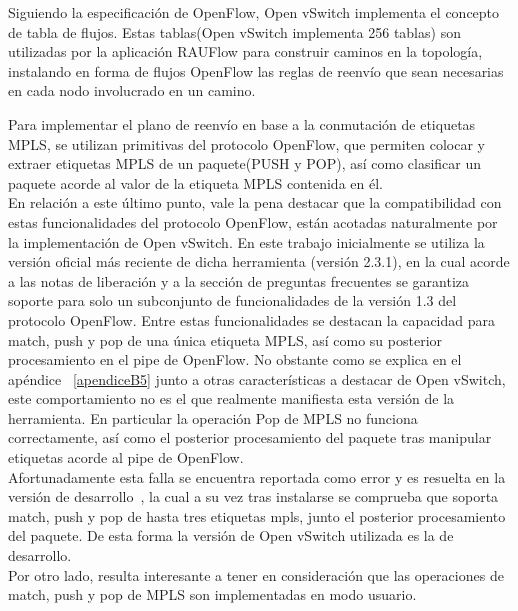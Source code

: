 Siguiendo la especificaci\'on de OpenFlow, Open vSwitch implementa el concepto de tabla de flujos. Estas tablas(Open vSwitch implementa 256 tablas) son utilizadas por la aplicaci\'on RAUFlow para construir caminos en la topolog\'ia, instalando en forma de flujos OpenFlow las reglas de reenvío que sean necesarias en cada nodo involucrado en un camino.

Para implementar el plano de reenvío en base a la conmutaci\'on de etiquetas MPLS, se utilizan primitivas del protocolo OpenFlow, que permiten colocar y extraer etiquetas MPLS de un paquete(PUSH y POP), así como clasificar un paquete acorde al valor de la etiqueta MPLS contenida en \'el.\\

En relaci\'on a este \'ultimo punto, vale la pena destacar que la compatibilidad con estas funcionalidades del protocolo OpenFlow, están acotadas naturalmente  por la implementaci\'on de Open vSwitch. En este trabajo inicialmente se utiliza la versi\'on oficial m\'as reciente de dicha herramienta (versi\'on 2.3.1), en la cual acorde a las notas de liberaci\'on y a la secci\'on de preguntas frecuentes se garantiza soporte para solo un subconjunto de funcionalidades de la versi\'on 1.3 del protocolo OpenFlow. Entre estas funcionalidades se destacan la capacidad para match, push y pop de una \'unica etiqueta MPLS, así como su posterior procesamiento en el pipe de OpenFlow. No obstante como se explica en el apéndice ~\ref{apendiceB5} junto a otras características a destacar de Open vSwitch, este comportamiento no es el que realmente manifiesta esta versi\'on de la herramienta. En particular la operación Pop de MPLS no funciona correctamente, así como el posterior procesamiento del paquete tras manipular etiquetas acorde al pipe de OpenFlow.\\ 

Afortunadamente esta falla se encuentra reportada como error y es resuelta en la versi\'on de desarrollo~\citep{OVSSourceCode}, la cual a su vez tras instalarse se comprueba que soporta match, push y pop de hasta tres etiquetas mpls, junto el posterior procesamiento del paquete. De esta forma la versi\'on de Open vSwitch utilizada es la de desarrollo.\\

Por otro lado, resulta interesante a tener en consideraci\'on que las operaciones de match, push y pop de MPLS son implementadas en modo usuario.


